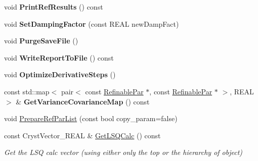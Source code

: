 \begin{DoxyCompactItemize}
void {\bfseries Print\+Ref\+Results} () const
\item 
\mbox{\label{class_obj_cryst_1_1_l_s_q_num_obj_a0eb066c4614a884d6da923c575d31132}} 
void {\bfseries Set\+Damping\+Factor} (const R\+E\+AL new\+Damp\+Fact)
\item 
\mbox{\label{class_obj_cryst_1_1_l_s_q_num_obj_ab91c3db60b9ce7de78a39191436878ae}} 
void {\bfseries Purge\+Save\+File} ()
\item 
\mbox{\label{class_obj_cryst_1_1_l_s_q_num_obj_a96c96355c925ea920ccee5d5d284e7c3}} 
void {\bfseries Write\+Report\+To\+File} () const
\item 
\mbox{\label{class_obj_cryst_1_1_l_s_q_num_obj_a29f4c2161390356d75ca1caec508a263}} 
void {\bfseries Optimize\+Derivative\+Steps} ()
\item 
\mbox{\label{class_obj_cryst_1_1_l_s_q_num_obj_a51bea0861a95fc0037253a8b0ed7bd72}} 
const std\+::map$<$ pair$<$ const \mbox{\hyperlink{class_obj_cryst_1_1_refinable_par}{Refinable\+Par}} $\ast$, const \mbox{\hyperlink{class_obj_cryst_1_1_refinable_par}{Refinable\+Par}} $\ast$ $>$, R\+E\+AL $>$ \& {\bfseries Get\+Variance\+Covariance\+Map} () const
\item 
void \mbox{\hyperlink{class_obj_cryst_1_1_l_s_q_num_obj_afdeb58450a3e0506fc02a0b5df15a600}{Prepare\+Ref\+Par\+List}} (const bool copy\+\_\+param=false)
\item 
\mbox{\label{class_obj_cryst_1_1_l_s_q_num_obj_a14a066b9584d08650e6af409efa4d227}} 
const Cryst\+Vector\+\_\+\+R\+E\+AL \& \mbox{\hyperlink{class_obj_cryst_1_1_l_s_q_num_obj_a14a066b9584d08650e6af409efa4d227}{Get\+L\+S\+Q\+Calc}} () const
\begin{DoxyCompactList}\small\item\em Get the L\+SQ calc vector (using either only the top or the hierarchy of object) \end{DoxyCompactList}\item 
\mbox{\label{class_obj_cryst_1_1_l_s_q_num_obj_aa31843004c510a2d98063c54d410521d}} 

\end{DoxyCompactItemize}
